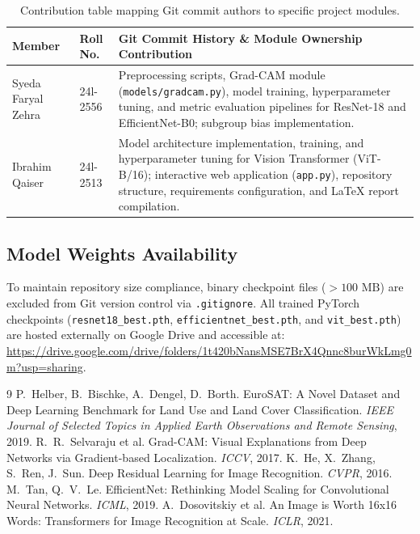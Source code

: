 \documentclass[11pt,a4paper]{article}
\begin{document}
\begin{table}[H]
\centering
\small
\begin{tabular}{@{}llp{8.8cm}@{}}
\toprule
\textbf{Member} & \textbf{Roll No.} & \textbf{Git Commit History \& Module Ownership Contribution} \\
\midrule
Syeda Faryal Zehra & 24l-2556 & Preprocessing scripts, Grad-CAM module (\texttt{models/gradcam.py}), model training, hyperparameter tuning, and metric evaluation pipelines for ResNet-18 and EfficientNet-B0; subgroup bias implementation. \\
Ibrahim Qaiser & 24l-2513 & Model architecture implementation, training, and hyperparameter tuning for Vision Transformer (ViT-B/16); interactive web application (\texttt{app.py}), repository structure, requirements configuration, and LaTeX report compilation. \\
\bottomrule
\end{tabular}
\caption{Contribution table mapping Git commit authors to specific project modules.}
\label{tab:git_contributions}
\end{table}

\subsection{Model Weights Availability}
To maintain repository size compliance, binary checkpoint files ($>100\text{ MB}$) are excluded from Git version control via \texttt{.gitignore}. All trained PyTorch checkpoints (\texttt{resnet18\_best.pth}, \texttt{efficientnet\_best.pth}, and \texttt{vit\_best.pth}) are hosted externally on Google Drive and accessible at: \\
\url{https://drive.google.com/drive/folders/1t420bNansMSE7BrX4Qnnc8burWkLmg0m?usp=sharing}.

\begin{thebibliography}{9}
 P.~Helber, B.~Bischke, A.~Dengel, D.~Borth.
  EuroSAT: A Novel Dataset and Deep Learning Benchmark for Land Use and Land Cover Classification.
  \emph{IEEE Journal of Selected Topics in Applied Earth Observations and Remote Sensing}, 2019.
 R.~R.~Selvaraju et al.
  Grad-CAM: Visual Explanations from Deep Networks via Gradient-based Localization.
  \emph{ICCV}, 2017.
 K.~He, X.~Zhang, S.~Ren, J.~Sun. Deep Residual Learning for Image Recognition. \emph{CVPR}, 2016.
 M.~Tan, Q.~V.~Le. EfficientNet: Rethinking Model Scaling for Convolutional Neural Networks. \emph{ICML}, 2019.
 A.~Dosovitskiy et al. An Image is Worth 16x16 Words: Transformers for Image Recognition at Scale. \emph{ICLR}, 2021.
\end{thebibliography}
\end{document}
